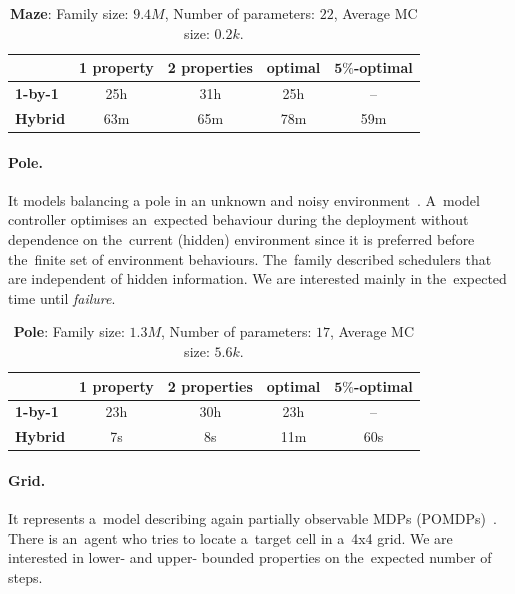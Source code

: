 \begin{table}[h!]
\centering
\begin{tabular}{l|cccc}
    \hline \hline 
    & \multicolumn{1}{l}{\textbf{1 property}} & \multicolumn{1}{l}{\textbf{2 properties}} & \multicolumn{1}{l}{\textbf{optimal}} & \multicolumn{1}{l}{\textbf{$\mathbf{5\%}$-optimal}} \\ \hline
    \textbf{1-by-1} & 25h & 31h & 25h & \,--\, \\
    \textbf{Hybrid} & 63m & 65m & 78m & 59m \\ \hline \hline
\end{tabular}
\caption{\textbf{Maze}:  Family size: $9.4M$, Number of parameters: $22$, Average MC size: $0.2k$.}
\end{table}

\paragraph{Pole.}
It models balancing a pole in an unknown and noisy environment~\cite{pole}.
A~model controller optimises an~expected behaviour during the deployment without dependence on the~current (hidden) environment since it is preferred before the~finite set of environment behaviours.
The~family described schedulers that are independent of hidden information.
We are interested mainly in the~expected time until \emph{failure}.

\begin{table}[h!]
\centering
\begin{tabular}{l|cccc}
    \hline \hline 
    & \multicolumn{1}{l}{\textbf{1 property}} & \multicolumn{1}{l}{\textbf{2 properties}} & \multicolumn{1}{l}{\textbf{optimal}} & \multicolumn{1}{l}{\textbf{$\mathbf{5\%}$-optimal}} \\ \hline
    \textbf{1-by-1} & 23h & 30h & 23h & \,--\, \\
    \textbf{Hybrid} & 7s & 8s & 11m & 60s \\ \hline \hline
\end{tabular}
\caption{\textbf{Pole}:  Family size: $1.3M$, Number of parameters: $17$, Average MC size: $5.6k$.}
\end{table}

\paragraph{Grid.}
It represents a~model describing again partially observable MDPs (POMDPs)~\cite{pomdp1}.
There is an~agent who tries to locate a~target cell in a~4x4 grid.
We are interested in lower- and upper- bounded properties on the~expected number of steps.

